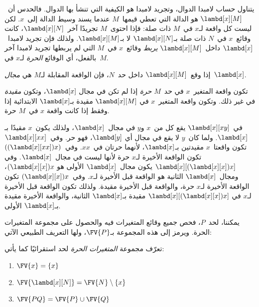 \documentclass[../../../include/open-logic-section]{subfiles}
\begin{document}

يتناول حساب لامبدا الدوال، وتجريد لامبدا هو الكيفية التي تنشأ بها الدوال.
فالحدس أن~$\lambd[x][M]$ هو الدالة التي تعطي قيمها~$M$ عندما يسند وسيط
الدالة إلى~$x$. لكن ليست كل واقعة لـ$x$ في~$M$ ذات صلة: فإذا احتوى~$M$
تجريدًا آخر~$\lambd[x][N]$، كانت وقائع~$x$ في~$N$ ذات صلة
بـ$\lambd[x][N]$ لا بـ$\lambd[x][M]$. ولذلك فإن تجريد لامبدا~$\lambd[x]$
داخل~$\lambd[x][M]$ \emph{يربط} وقائع~$x$ في~$M$ التي لم يربطها تجريد
لامبدا آخر بالفعل، أي الوقائع \emph{الحرة} لـ$x$ في~$M$.

\begin{defn}[المجال]
إذا وقع~$\lambd[x][M]$ داخل حد~$N$، فإن الواقعة المقابلة لـ$M$ هي
\emph{مجال}~$\lambd[x]$.
\end{defn}


\begin{defn}
  تكون واقعة المتغير~$x$ في حد~$M$ \emph{حرة} إذا لم تكن في مجال
  $\lambd[x]$، وتكون \emph{مقيدة} في غير ذلك. وتكون واقعة المتغير~$x$ في
  $\lambd[x][M]$ مقيدة بـ$\lambd[x]$ الابتدائية إذا وفقط إذا كانت واقعة
  $x$ في~$M$ حرة.
\end{defn}

\begin{ex}
  في~$\lambd[x][x y]$ يقع كل من~$x$ و$y$ في مجال~$\lambd[x]$، ولذلك
  يكون~$x$ مقيدًا بـ$\lambd[x]$. ولما كان~$y$ لا يقع في مجال أي
  $\lambd[y]$، فهو حر. وفي~$\lambd[x][x x]$ تكون واقعتا~$x$ مقيدتين
  بـ$\lambd[x]$، لأنهما حرتان في~$xx$. وفي~$((\lambd[x][xx])x)$ تكون
  الواقعة الأخيرة لـ$x$ حرة لأنها ليست في مجال~$\lambd[x]$. وفي
  $\lambd[x][(\lambd[x][x])x]$ يكون مجال~$\lambd[x]$ الأولى هو
  $(\lambd[x][x])x$، ومجال~$\lambd[x]$ الثانية هو الواقعة قبل الأخيرة
  لـ$x$. وفي~$(\lambd[x][x])x$ تكون الواقعة الأخيرة لـ$x$ حرة، والواقعة
  قبل الأخيرة مقيدة. ولذلك تكون الواقعة قبل الأخيرة لـ$x$ في
  $\lambd[x][(\lambd[x][x])x]$ مقيدة بـ$\lambd[x]$ الثانية، والواقعة
  الأخيرة مقيدة بـ$\lambd[x]$ الأولى.
\end{ex}

يمكننا، لحد~$P$، فحص جميع وقائع المتغيرات فيه والحصول على مجموعة
المتغيرات الحرة. ويرمز إلى هذه المجموعة بـ$\FV{P}$، ولها التعريف الطبيعي
الآتي:

\begin{defn} 
  تعرّف مجموعة \emph{المتغيرات الحرة} لحد استقرائيًا كما يأتي:
  \begin{enumerate}
    \item $\FV{x} = \{x\}$ 
    \item $\FV{\lambd[x][N]} = \FV{N} \setminus \{x\}$    
    \item $\FV{PQ} = \FV{P} \cup \FV{Q}$ 
  \end{enumerate}
\end{defn}
\end{document}
